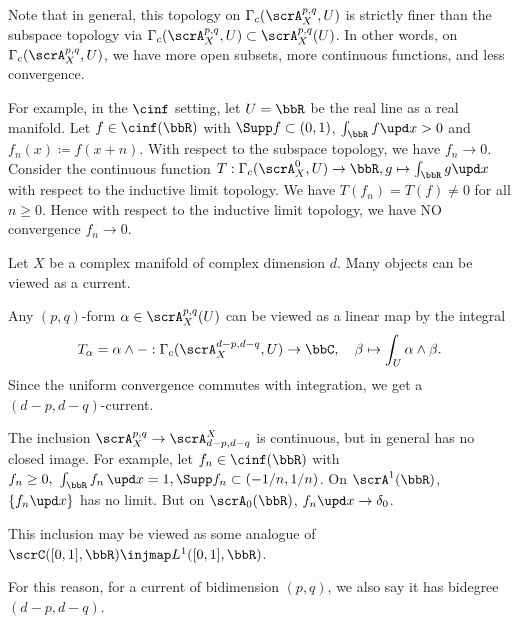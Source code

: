\begin{remark}[label=\labelNFM{rmk:inductive-topo-on-the-space-for-compact-support-forms}, status=draft, tag=0000000]
	Note that in general, this topology on $\Gamma_c(\scrA_X^{p,q},U)$ is strictly finer than the subspace topology via $\Gamma_c(\scrA_X^{p,q},U) \subset \scrA_X^{p,q}(U)$.
	In other words, on $\Gamma_c(\scrA_X^{p,q},U)$, we have more open subsets, more continuous functions, and less convergence.

	For example, in the $\cinf$ setting, let $U = \bbR$ be the real line as a real manifold.
	Let $f \in \cinf(\bbR)$ with $\Supp f \subset (0,1)$, $\int_\bbR f \upd x > 0$ and $f_n(x) \coloneqq f(x+n)$.
	With respect to the subspace topology, we have $f_n \to 0$.
	Consider the continuous function $T: \Gamma_c(\scrA_X^{0},U) \to \bbR, g \mapsto \int_\bbR g \upd x$ with respect to the inductive limit topology.
	We have $T(f_n) = T(f) \neq 0$ for all $n \geq 0$.
	Hence with respect to the inductive limit topology, we have NO convergence $f_n \to 0$.
\end{remark}

Let $X$ be a complex manifold of  complex dimension $d$.
Many objects can be viewed as a current.


\begin{example}[label=\labelNFM{eg:forms-as-currents}, status=draft, tag=0000000, title={Forms as currents}]
	Any $(p,q)$-form $\alpha \in \scrA_X^{p,q}(U)$ can be viewed as a linear map by the integral
	\[ T_\alpha = \alpha \wedge - : \Gamma_c(\scrA_X^{d-p,d-q},U) \to \bbC, \quad \beta \mapsto \int_U \alpha \wedge \beta. \]
	Since the uniform convergence commutes with integration, we get a $(d-p,d-q)$-current.

	The inclusion $\scrA_X^{p,q} \to \scrA^X_{d-p,d-q}$ is continuous, but in general has no closed image.
	For example, let $f_n \in \cinf(\bbR)$ with $f_n \geq 0,\ \int_\bbR f_n\,\upd x = 1, \Supp f_n \subset (-1/n,1/n)$.
	On $\scrA^1(\bbR)$, $\{f_n \upd x\}$ has no limit.
	But on $\scrA_0(\bbR)$, $f_n \upd x \to \delta_0$.

	This inclusion may be viewed as some analogue of $\scrC([0,1],\bbR) \injmap L^1([0,1],\bbR)$.

	For this reason, for a current of bidimension $(p,q)$, we also say it has bidegree $(d-p,d-q)$.
\end{example}


